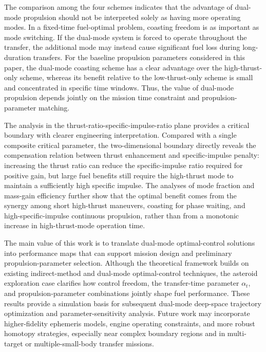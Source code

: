 ﻿\documentclass{IEEEtaes}
\begin{document}
The comparison among the four schemes indicates that the advantage of dual-mode propulsion should not be interpreted solely as having more operating modes. In a fixed-time fuel-optimal problem, coasting freedom is as important as mode switching. If the dual-mode system is forced to operate throughout the transfer, the additional mode may instead cause significant fuel loss during long-duration transfers. For the baseline propulsion parameters considered in this paper, the dual-mode coasting scheme has a clear advantage over the high-thrust-only scheme, whereas its benefit relative to the low-thrust-only scheme is small and concentrated in specific time windows. Thus, the value of dual-mode propulsion depends jointly on the mission time constraint and propulsion-parameter matching.

The analysis in the thrust-ratio-specific-impulse-ratio plane provides a critical boundary with clearer engineering interpretation. Compared with a single composite critical parameter, the two-dimensional boundary directly reveals the compensation relation between thrust enhancement and specific-impulse penalty: increasing the thrust ratio can reduce the specific-impulse ratio required for positive gain, but large fuel benefits still require the high-thrust mode to maintain a sufficiently high specific impulse. The analyses of mode fraction and mass-gain efficiency further show that the optimal benefit comes from the synergy among short high-thrust maneuvers, coasting for phase waiting, and high-specific-impulse continuous propulsion, rather than from a monotonic increase in high-thrust-mode operation time.

The main value of this work is to translate dual-mode optimal-control solutions into performance maps that can support mission design and preliminary propulsion-parameter selection. Although the theoretical framework builds on existing indirect-method and dual-mode optimal-control techniques, the asteroid exploration case clarifies how control freedom, the transfer-time parameter $\alpha_t$, and propulsion-parameter combinations jointly shape fuel performance. These results provide a simulation basis for subsequent dual-mode deep-space trajectory optimization and parameter-sensitivity analysis. Future work may incorporate higher-fidelity ephemeris models, engine operating constraints, and more robust homotopy strategies, especially near complex boundary regions and in multi-target or multiple-small-body transfer missions.




\end{document}
